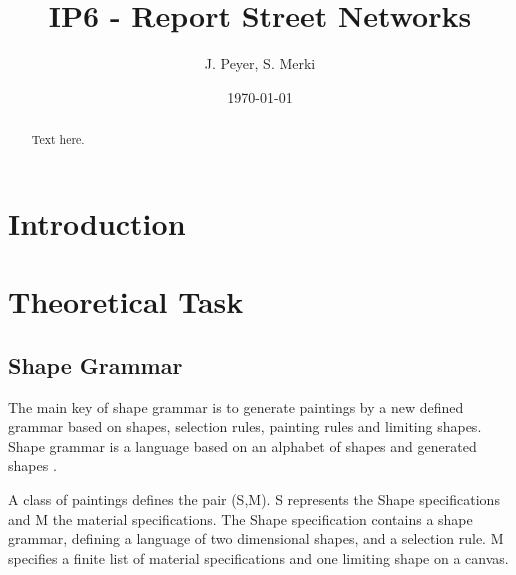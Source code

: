 \documentclass[11pt, a4paper]{report}
\begin{document}
\begin{titlepage}
    \title{IP6 - Report Street Networks}
    \date{\today}
    \author{J. Peyer, S. Merki}
    \maketitle
\end{titlepage}
\setcounter{page}{1}

\tableofcontents



\begin{abstract}
    Text here.
\end{abstract}

\chapter{Introduction}

\chapter{Theoretical Task}
\section{Shape Grammar}
The main key of shape grammar is to generate paintings by a new defined grammar based on shapes, selection rules, painting rules and limiting shapes. Shape grammar is a language based on an alphabet of shapes and generated shapes \citep{shapeGrammars:1972}. 

A class of paintings defines the pair (S,M). S represents the Shape specifications and M the material specifications. The Shape specification contains a shape grammar, defining a language of two dimensional shapes, and a selection rule. M specifies a finite list of material specifications and one limiting shape on a canvas.
\end{document}
